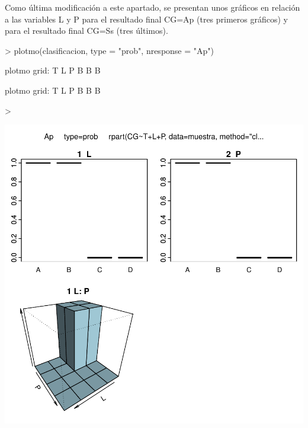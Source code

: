 \documentclass [a4paper] {article}
\begin{document}
Como última modificación a este apartado, se presentan unos gráficos en relación a las variables L y P
para el resultado final CG=Ap (tres primeros gráficos) y para el resultado final CG=Ss (tres últimos).

\begin{Schunk}
\begin{Sinput}
> plotmo(clasificacion, type = "prob", nresponse = "Ap")
\end{Sinput}
\begin{Soutput}
 plotmo grid:    T L P
                 B B B
\end{Soutput}
\begin{Soutput}
 plotmo grid:    T L P
                 B B B
\end{Soutput}
\begin{Sinput}
> 
\end{Sinput}
\end{Schunk}
\includegraphics{Memoria-Figura 7}
\end{document}
